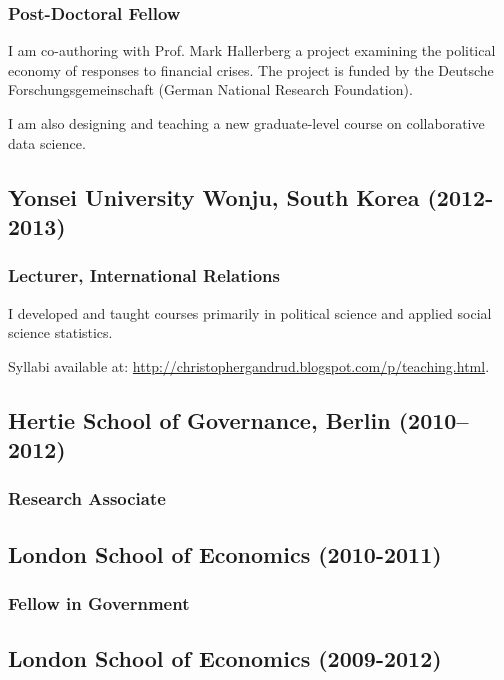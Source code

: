\documentclass[a4paper]{article}
\begin{document}
{\subsubsection*{Post-Doctoral Fellow}

I am co-authoring with Prof. Mark Hallerberg a project examining the political economy of responses to financial crises. The project is funded by the Deutsche Forschungsgemeinschaft (German National Research Foundation).\vspace{0.25cm}

\noindent I am also designing and teaching a new graduate-level course on collaborative data science.

\subsection*{Yonsei University Wonju, South Korea (2012-2013)}
{\subsubsection*{Lecturer, International Relations}

I developed and taught courses primarily in political science and applied social science statistics.
\vspace{0.25cm}

\noindent Syllabi available at: \url{http://christophergandrud.blogspot.com/p/teaching.html}.

\subsection*{Hertie School of Governance, Berlin (2010--2012)}
\subsubsection*{Research Associate}

\subsection*{London School of Economics (2010-2011)}
\subsubsection*{Fellow in Government}

\subsection*{London School of Economics (2009-2012)}
}}
\end{document}
